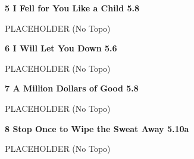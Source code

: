 \begin{multicols}{2}
\needspace{1.5cm}
\label{rt:I Fell for You Like a Child}
\colorbox{green!20}{
\parbox{0.95\linewidth}{
\textbf{
5 I Fell for You Like a Child 5.8  
}}}

\begin{adjustwidth}{0.5cm}{}			
PLACEHOLDER (No Topo)
\end{adjustwidth}



\needspace{1.5cm}
\label{rt:I Will Let You Down}
\colorbox{green!20}{
\parbox{0.95\linewidth}{
\textbf{
6 I Will Let You Down 5.6  
}}}

\begin{adjustwidth}{0.5cm}{}			
PLACEHOLDER (No Topo)
\end{adjustwidth}



\needspace{1.5cm}
\label{rt:A Million Dollars of Good}
\colorbox{green!20}{
\parbox{0.95\linewidth}{
\textbf{
7 A Million Dollars of Good 5.8  
}}}

\begin{adjustwidth}{0.5cm}{}			
PLACEHOLDER (No Topo)
\end{adjustwidth}



\needspace{1.5cm}
\label{rt:Stop Once to Wipe the Sweat Away}
\colorbox{RoyalBlue!20}{
\parbox{0.95\linewidth}{
\textbf{
8 Stop Once to Wipe the Sweat Away 5.10a  
}}}

\begin{adjustwidth}{0.5cm}{}			
PLACEHOLDER (No Topo)
\end{adjustwidth}





\end{multicols}
\clearpage
